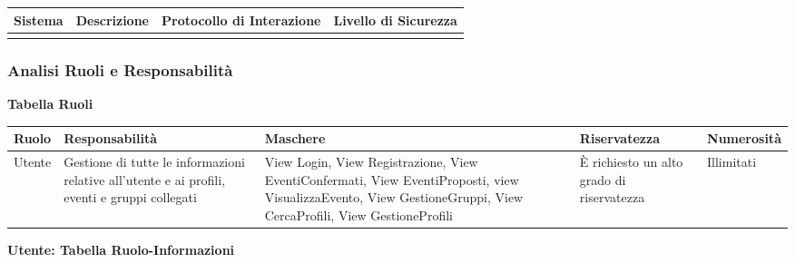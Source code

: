 \begin{tabular} {|P{2.5cm}|P{3cm}|P{4.5cm}|P{4.5cm}|}
    \hline
    \textbf{Sistema} & \textbf{Descrizione} & \textbf{Protocollo di Interazione} & \textbf{Livello di Sicurezza} \\
    \hline
                     &                      &                                    &                               \\
    \hline
\end{tabular}
\hfill \break

\newpage

\subsubsection{Analisi Ruoli e Responsabilità}
\hfill \break

\textbf{Tabella Ruoli}
\hfill \break

\begin{tabular} {|P{2cm}|P{3cm}|P{4cm}|P{2.5cm}|P{2.5cm}|}
    \hline
    \textbf{Ruolo} & \textbf{Responsabilità}                                                                       & \textbf{Maschere}                                                                                                                                               & \textbf{Riservatezza}                     & \textbf{Numerosità} \\
    \hline
    Utente         & Gestione di tutte le informazioni relative all'utente e ai profili, eventi e gruppi collegati & View Login, View Registrazione, View EventiConfermati, View EventiProposti, view VisualizzaEvento, View GestioneGruppi, View CercaProfili, View GestioneProfili & È richiesto un alto grado di riservatezza & Illimitati          \\
    \hline
\end{tabular}
\hfill \break


\textbf{Utente: Tabella Ruolo-Informazioni}
\hfill \break

